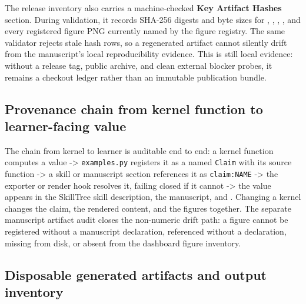 \documentclass[
  english,
]{article}
\begin{document}
The release inventory also carries a machine-checked \textbf{Key
Artifact Hashes} section. During validation, it records SHA-256 digests
and byte sizes for ,
,
,
, and every registered figure
PNG currently named by the figure registry. The same validator rejects
stale hash rows, so a regenerated artifact cannot silently drift from
the manuscript's local reproducibility evidence. This is still local
evidence: without a release tag, public archive, and clean external
blocker probes, it remains a checkout ledger rather than an immutable
publication bundle.

\subsection{Provenance chain from kernel function to learner-facing
value}\label{provenance-chain-from-kernel-function-to-learner-facing-value}

The chain from kernel to learner is auditable end to end: a kernel
function computes a value -\textgreater{} \texttt{examples.py} registers
it as a named \texttt{Claim} with its source function -\textgreater{} a
skill or manuscript section references it as \texttt{claim:NAME}
-\textgreater{} the exporter or render hook resolves it, failing closed
if it cannot -\textgreater{} the value appears in the SkillTree skill
description, the manuscript, and .
Changing a kernel changes the claim, the rendered content, and the
figures together. The separate manuscript artifact audit closes the
non-numeric drift path: a figure cannot be registered without a
manuscript declaration, referenced without a declaration, missing from
disk, or absent from the dashboard figure inventory.

\subsection{Disposable generated artifacts and output
inventory}\label{disposable-generated-artifacts-and-output-inventory}
\end{document}
